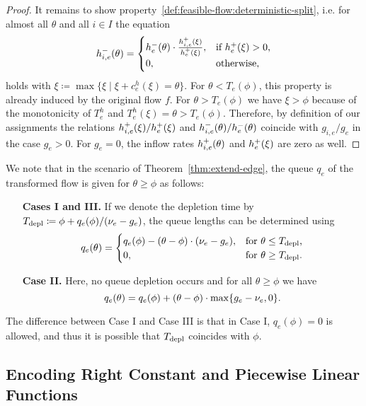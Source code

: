\begin{proof}
    It remains to show property~\ref{def:feasible-flow:deterministic-split}, i.e. for almost all $\theta$ and all $i\in I$ the equation
    \[
        \outfl[h]_{i,e}(\theta) = \begin{cases}
            \outfl[h]_e(\theta) \cdot \frac{\infl[h]_{i,e}(\xi)}{\infl[h]_e(\xi)}, & \text{if $\infl[h]_e(\xi) > 0$,}\\
            0, & \text{otherwise,}
        \end{cases}
    \]
    holds with $\xi\coloneqq \max \{ \xi  \mid \xi + c^h_e(\xi) = \theta \}$.
    For $\theta < T_e(\phi)$, this property is already induced by the original flow $f$.
    For $\theta > T_e(\phi)$ we have $\xi > \phi$ because of the monotonicity of $T^h_e$ and $T^h_e(\xi) = \theta > T_e(\phi)$.
    Therefore, by definition of our assignments the relations $\infl[h]_{i,e}(\xi) / \infl[h]_{e}(\xi)$ and $\outfl[h]_{i,e}(\theta) / \outfl[h]_{e}(\theta)$ coincide with $g_{i,e}/g_e$ in the case $g_e > 0$.
    For $g_e = 0$, the inflow rates $\infl[h]_{i,e}(\theta)$ and $\infl[h]_{e}(\xi)$ are zero as well.
\end{proof}

We note that in the scenario of Theorem~\ref{thm:extend-edge}, the queue $q_e$ of the transformed flow is given for $\theta \geq \phi$ as follows:
\begin{enumerate}[align=left,leftmargin=*]
    \item[\textbf{Cases I and III.}] If we denote the depletion time by $T_{\depl} \coloneqq \phi + q_e(\phi) / (\capa_e - g_e)$, the queue lengths can be determined using \[
        q_e(\theta) = \begin{cases}
            q_e(\phi) - (\theta - \phi)\cdot (\capa_e - g_e), & \text{for $\theta \leq T_{\depl}$,}\\
            0, & \text{for $\theta \geq T_{\depl}$.}
        \end{cases}
    \]
    \item[\textbf{Case II.}] Here, no queue depletion occurs and for all $\theta \geq \phi$ we have \[
        q_e(\theta) = q_e(\phi) + (\theta - \phi)\cdot \max\{g_e - \capa_e, 0\}.
    \]
\end{enumerate}

The difference between Case I and Case III is that in Case I, $q_e(\phi) = 0$ is allowed, and thus it is possible that $T_{\depl}$ coincides with $\phi$.


\subsection{Encoding Right Constant and Piecewise Linear Functions}

